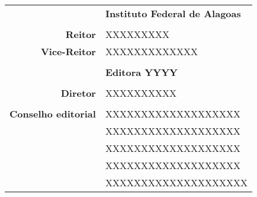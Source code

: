 \thispagestyle{empty}

\begin{center}

\begin{tabular}{r:l}
						& \textbf{\Large Instituto Federal de Alagoas}				\\
						&														\\
	{\bf Reitor} 		& XXXXXXXXX									\\
	{\bf Vice-Reitor}	& XXXXXXXXXXXXX										\\
						&														\\
						& \textbf{\Large Editora YYYY}							\\
						&														\\
	{\bf Diretor}		& XXXXXXXXXX							\\
						&														\\
	{\bf Conselho editorial}	&	XXXXXXXXXXXXXXXXXXX					\\
								&	XXXXXXXXXXXXXXXXXXX				\\
								&	XXXXXXXXXXXXXXXXXXX			\\
								&	XXXXXXXXXXXXXXXXXXX	\\
								&	XXXXXXXXXXXXXXXXXXXX						\\
\end{tabular}

\end{center}

\clearpage
